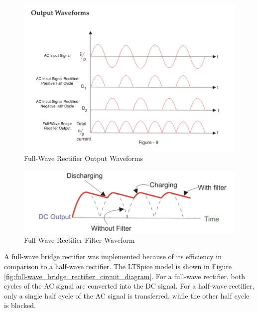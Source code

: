 \documentclass[conference]{IEEEtran}
\begin{document}
\begin{figure}[htp]
    \centering
    \includegraphics[width=1.0\linewidth]{full-wave_bridge_rectifier_output_waveform.png}
    \caption{Full-Wave Rectifier Output Waveforms}
    \label{fig:full-wave_rectifier_output_waveform_diagram}
\end{figure}

\begin{figure}[h]
    \centering
    \includegraphics[width=1.0\linewidth]{full-wave_bridge_rectifier_filter_waveform.png}
    \caption{Full-Wave Rectifier Filter Waveform}
    \label{fig:full-wave_bridge_rectifier_filter_waveform_diagram}
\end{figure}


A full-wave bridge rectifier was implemented because of its efficiency in comparison to a half-wave rectifier. The LTSpice model is shown in Figure \ref{fig:full-wave_bridge_rectifier_circuit_diagram}. For a full-wave rectifier, both cycles of the AC signal are converted into the DC signal. For a half-wave rectifier, only a single half cycle of the AC signal is transferred, while the other half cycle is blocked. 
\end{document}
